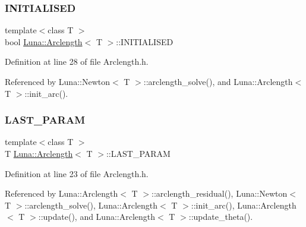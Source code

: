 \mbox{\label{classLuna_1_1Arclength_a9bf5e636e7a0772f3ba5476ec2c83f6a}} 
\subsubsection{\texorpdfstring{I\+N\+I\+T\+I\+A\+L\+I\+S\+ED}{INITIALISED}}
{\footnotesize\ttfamily template$<$class T $>$ \\
bool \hyperlink{classLuna_1_1Arclength}{Luna\+::\+Arclength}$<$ T $>$\+::I\+N\+I\+T\+I\+A\+L\+I\+S\+ED\hspace{0.3cm}{\ttfamily [protected]}}



Definition at line 28 of file Arclength.\+h.



Referenced by Luna\+::\+Newton$<$ T $>$\+::arclength\+\_\+solve(), and Luna\+::\+Arclength$<$ T $>$\+::init\+\_\+arc().

\mbox{\label{classLuna_1_1Arclength_a98e8241f24a16ea9f12e514d8d8f841b}} 
\subsubsection{\texorpdfstring{L\+A\+S\+T\+\_\+\+P\+A\+R\+AM}{LAST\_PARAM}}
{\footnotesize\ttfamily template$<$class T $>$ \\
T \hyperlink{classLuna_1_1Arclength}{Luna\+::\+Arclength}$<$ T $>$\+::L\+A\+S\+T\+\_\+\+P\+A\+R\+AM\hspace{0.3cm}{\ttfamily [protected]}}



Definition at line 23 of file Arclength.\+h.



Referenced by Luna\+::\+Arclength$<$ T $>$\+::arclength\+\_\+residual(), Luna\+::\+Newton$<$ T $>$\+::arclength\+\_\+solve(), Luna\+::\+Arclength$<$ T $>$\+::init\+\_\+arc(), Luna\+::\+Arclength$<$ T $>$\+::update(), and Luna\+::\+Arclength$<$ T $>$\+::update\+\_\+theta().

